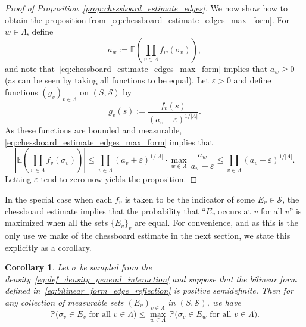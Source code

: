\documentclass[12pt,reqno]{article}
\def\E{\mathbb{E}}
\def\cS{\mathcal{S}}
\newtheorem{cor}[theorem]{Corollary}
\def\eps{\varepsilon}
\renewcommand{\Pr}{\mathbb{P}}
\begin{document}
\begin{proof}[Proof of Proposition~\ref{prop:chessboard_estimate_edges}]
We now show how to obtain the proposition from~\eqref{eq:chessboard_estimate_edges_max_form}. For $w \in \Lambda$, define
\[ a_w := \E\left(\prod_{v \in \Lambda} f_w(\sigma_v)\right) ,\]
and note that~\eqref{eq:chessboard_estimate_edges_max_form} implies that $a_w \ge 0$ (as can be seen by taking all functions to be equal). Let $\eps>0$ and define functions $(g_v)_{v \in \Lambda}$ on $(S,\cS)$ by
\[ g_v(s) := \frac{f_v(s)}{(a_v+\eps)^{1/|\Lambda|}} .\]
As these functions are bounded and measurable, \eqref{eq:chessboard_estimate_edges_max_form} implies that
\[ \left|\E\left(\prod_{v \in \Lambda} f_v(\sigma_v) \right)\right| \le \prod_{v \in \Lambda} (a_v+\eps)^{1/|\Lambda|} \cdot \max_{w \in \Lambda}\, \frac{a_w}{a_w + \eps} \le \prod_{v \in \Lambda} (a_v+\eps)^{1/|\Lambda|} .\]
Letting $\eps$ tend to zero now yields the proposition.
\end{proof}


In the special case when each $f_v$ is taken to be the indicator of some $E_v \in \cS$, the chessboard estimate implies that the probability that ``$E_v$ occurs at $v$ for all $v$'' is maximized when all the sets $\{E_v\}_v$ are equal. For convenience, and as this is the only use we make of the chessboard estimate in the next section, we state this explicitly as a corollary.

\begin{cor}\label{cor:chessboard_estimate_edges_simplified}
	Let $\sigma$ be sampled from the density~\eqref{eq:def_density_general_interaction} and suppose that the bilinear form defined in~\eqref{eq:bilinear_form_edge_reflection} is positive semidefinite.
	Then for any collection of measurable sets $(E_v)_{v \in \Lambda}$ in $(S,\cS)$, we have
	\[ \Pr\Big(\sigma_v \in E_v\text{ for all }v \in \Lambda \Big) \le \max_{w \in \Lambda}\, \Pr\Big(\sigma_v \in E_w\text{ for all }v \in \Lambda \Big) .\]
\end{cor}
\end{document}
